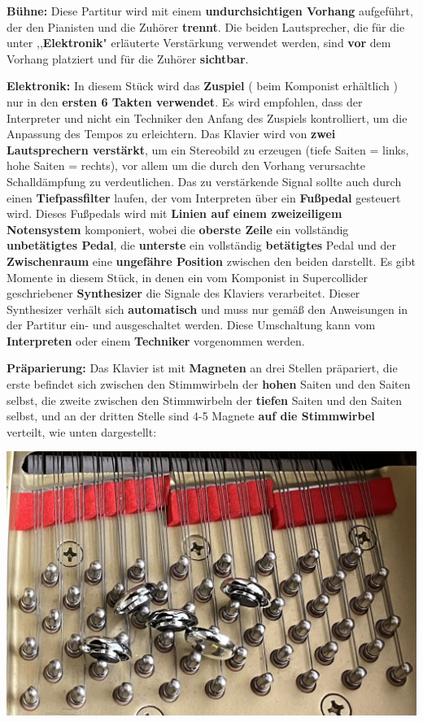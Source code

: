 \documentclass[12pt]{article}
\newcommand*\circled[1]{\tikz[baseline=(char.base)]{
            \node[shape=circle,draw,inner sep=1pt] (char) {#1};}}
\begin{document}
\begingroup
\textbf{Bühne: \circled{1}} Diese Partitur wird mit einem \textbf{undurchsichtigen Vorhang} aufgeführt, der den Pianisten und die Zuhörer \textbf{trennt}. Die beiden Lautsprecher, die für die unter ,,\textbf{Elektronik}" erläuterte Verstärkung verwendet werden, sind \textbf{vor} dem Vorhang platziert und für die Zuhörer \textbf{sichtbar}.
\endgroup

\begingroup
\textbf{Elektronik: \circled{1}} In diesem Stück wird das \textbf{Zuspiel} ( beim Komponist erhältlich ) nur in den \textbf{ersten 6 Takten verwendet}. Es wird empfohlen, dass der Interpreter und nicht ein Techniker den Anfang des Zuspiels kontrolliert, um die Anpassung des Tempos zu erleichtern. \textbf{\circled{2}} Das Klavier wird von \textbf{zwei Lautsprechern verstärkt}, um ein Stereobild zu erzeugen (tiefe Saiten = links, hohe Saiten = rechts), vor allem um die durch den Vorhang verursachte Schalldämpfung zu verdeutlichen. \textbf{\circled{3}} Das zu verstärkende Signal sollte auch durch einen \textbf{Tiefpassfilter} laufen, der vom Interpreten über ein \textbf{Fußpedal} gesteuert wird. Dieses Fußpedals wird mit \textbf{Linien auf einem zweizeiligem Notensystem} komponiert, wobei die \textbf{oberste Zeile} ein vollständig \textbf{unbetätigtes Pedal}, die \textbf{unterste} ein vollständig \textbf{betätigtes} Pedal und der \textbf{Zwischenraum} eine \textbf{ungefähre Position} zwischen den beiden darstellt. \textbf{\circled{4}} Es gibt Momente in diesem Stück, in denen ein vom Komponist in Supercollider geschriebener \textbf{Synthesizer} die Signale des Klaviers verarbeitet. Dieser Synthesizer verhält sich \textbf{automatisch} und muss nur gemäß den Anweisungen in der Partitur ein- und ausgeschaltet werden. Diese Umschaltung kann vom \textbf{Interpreten} oder einem \textbf{Techniker} vorgenommen werden.
\endgroup

\begingroup
\textbf{Präparierung: \circled{1}} Das Klavier ist mit \textbf{Magneten} an drei Stellen präpariert, die erste befindet sich zwischen den Stimmwirbeln der \textbf{hohen} Saiten und den Saiten selbst, die zweite zwischen den Stimmwirbeln der \textbf{tiefen} Saiten und den Saiten selbst, und an der dritten Stelle sind 4-5 Magnete \textbf{auf  die Stimmwirbel} verteilt, wie unten dargestellt:

\begin{center}
\includegraphics[scale=0.70]{magnets.jpg}
\end{center}
\end{document}
